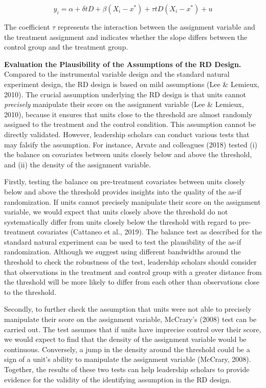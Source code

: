 \documentclass[english]{article}
\begin{document}
\begin{equation}
	y_{i} = \alpha + \delta t D + \beta(X_{i} - x^{*}) + 
		\tau t D (X_{i} - x^{*}) + u
	\label{eq:rdd_interaction}
\end{equation}

The coefficient $\tau$ represents the interaction between the assignment
variable and the treatment assignment and indicates whether the slope
differs between the control group and the treatment group.

\noindent \textbf{Evaluation the Plausibility of the Assumptions of the RD
Design.}
Compared to the instrumental variable design and the standard natural
experiment design, the RD design is based on mild assumptions (Lee \&
Lemieux, 2010). The crucial assumption underlying the RD design is that
units cannot \emph{precisely} manipulate their score on the assignment
variable (Lee \& Lemieux, 2010), because it ensures that units close to
the threshold are almost randomly assigned to the treatment and the
control condition. This assumption cannot be directly validated.
However, leadership scholars can conduct various tests that may falsify
the assumption. For instance, Arvate and colleagues (2018) tested (i)
the balance on covariates between units closely below and above the
threshold, and (ii) the density of the assignment variable.

Firstly, testing the balance on pre-treatment covariates between units
closely below and above the threshold provides insights into the quality
of the as-if randomization. If units cannot precisely manipulate their
score on the assignment variable, we would expect that units closely
above the threshold do not systematically differ from units closely
below the threshold with regard to pre-treatment covariates (Cattaneo et
al., 2019). The balance test as described for the standard natural
experiment can be used to test the plausibility of the as-if
randomization. Although we suggest using different bandwidths around the
threshold to check the robustness of the test, leadership scholars
should consider that observations in the treatment and control group
with a greater distance from the threshold will be more likely to differ
from each other than observations close to the threshold.

Secondly, to further check the assumption that units were not able to
precisely manipulate their score on the assignment variable, McCrary's
(2008) test can be carried out. The test assumes that if units have
imprecise control over their score, we would expect to find that the
density of the assignment variable would be continuous. Conversely, a
jump in the density around the threshold could be a sign of a unit's
ability to manipulate the assignment variable (McCrary, 2008). Together,
the results of these two tests can help leadership scholars to provide
evidence for the validity of the identifying assumption in the RD
design.
\end{document}
